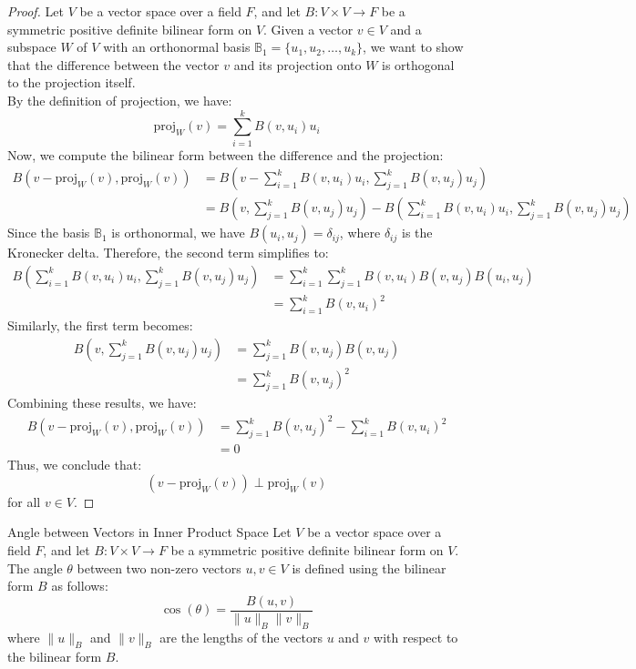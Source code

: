 \documentclass[openany]{book}
\begin{document}
\begin{proof}
Let $V$ be a vector space over a field $F$, and let $B: V \times V \to F$ be a symmetric positive definite bilinear form on $V$. Given a vector $v \in V$ and a subspace $W$ of $V$ with an orthonormal basis $\mathbb{B}_1 = \{u_1, u_2, \ldots, u_k\}$, we want to show that the difference between the vector $v$ and its projection onto $W$ is orthogonal to the projection itself. \\
By the definition of projection, we have:
$$\text{proj}_W(v) = \sum_{i=1}^k B(v, u_i) u_i$$
Now, we compute the bilinear form between the difference and the projection:
\[\begin{aligned}
B(v - \text{proj}_W(v), \text{proj}_W(v))
&= B\left(v - \sum_{i=1}^k B(v, u_i) u_i, \sum_{j=1}^k B(v, u_j) u_j\right) \\
&= B\left(v, \sum_{j=1}^k B(v, u_j) u_j\right) - B\left(\sum_{i=1}^k B(v, u_i) u_i, \sum_{j=1}^k B(v, u_j) u_j\right)
\end{aligned}\]
Since the basis $\mathbb{B}_1$ is orthonormal, we have $B(u_i, u_j) = \delta_{ij}$, where $\delta_{ij}$ is the Kronecker delta. Therefore, the second term simplifies to:
\[\begin{aligned}
B\left(\sum_{i=1}^k B(v, u_i) u_i, \sum_{j=1}^k B(v, u_j) u_j\right)
&= \sum_{i=1}^k \sum_{j=1}^k B(v, u_i) B(v, u_j) B(u_i, u_j) \\
&= \sum_{i=1}^k B(v, u_i)^2
\end{aligned}\]
Similarly, the first term becomes:
\[\begin{aligned}
B\left(v, \sum_{j=1}^k B(v, u_j) u_j\right)
&= \sum_{j=1}^k B(v, u_j) B(v, u_j) \\
&= \sum_{j=1}^k B(v, u_j)^2
\end{aligned}\]
Combining these results, we have:
\[\begin{aligned}
B(v - \text{proj}_W(v), \text{proj}_W(v))
&= \sum_{j=1}^k B(v, u_j)^2 - \sum_{i=1}^k B(v, u_i)^2 \\
&= 0
\end{aligned}\]
Thus, we conclude that:
$$(v - \text{proj}_W(v)) \perp \text{proj}_W(v)$$
for all $v \in V$.
\end{proof}
\begin{mydefinition}{Angle between Vectors in Inner Product Space}
Let $V$ be a vector space over a field $F$, and let $B: V \times V \to F$ be a symmetric positive definite bilinear form on $V$. The angle $\theta$ between two non-zero vectors $u, v \in V$ is defined using the bilinear form $B$ as follows:
$$\cos(\theta) = \frac{B(u, v)}{\|u\|_B \|v\|_B}$$
where $\|u\|_B$ and $\|v\|_B$ are the lengths of the vectors $u$ and $v$ with respect to the bilinear form $B$.
\end{mydefinition}
\end{document}
